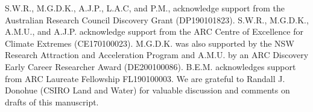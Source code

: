 \documentclass[gc, manuscript]{copernicus}
\begin{document}
\begin{acknowledgements}
S.W.R., M.G.D.K., A.J.P., L.A.C, and P.M., acknowledge support from the
Australian Research Council Discovery Grant (DP190101823). S.W.R.,
M.G.D.K., A.M.U., and A.J.P. acknowledge support from the ARC Centre of
Excellence for Climate Extremes (CE170100023). M.G.D.K. was also
supported by the NSW Research Attraction and Acceleration Program and
A.M.U. by an ARC Discovery Early Career Researcher Award (DE200100086).
B.E.M. acknowledges support from ARC Laureate Fellowship FL190100003. We
are grateful to Randall J. Donohue (CSIRO Land and Water) for valuable
discussion and comments on drafts of this manuscript.
\end{acknowledgements}







\end{document}
